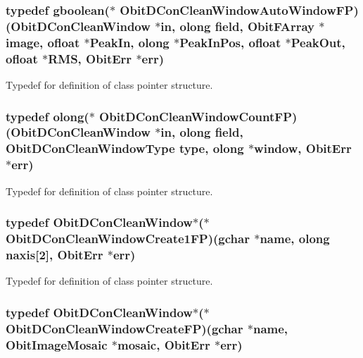 \subsubsection{\setlength{\rightskip}{0pt plus 5cm}typedef gboolean($\ast$ {\bf Obit\-DCon\-Clean\-Window\-Auto\-Window\-FP})({\bf Obit\-DCon\-Clean\-Window} $\ast$in, {\bf olong} field, {\bf Obit\-FArray} $\ast$image, {\bf ofloat} $\ast$Peak\-In, {\bf olong} $\ast$Peak\-In\-Pos, {\bf ofloat} $\ast$Peak\-Out, {\bf ofloat} $\ast$RMS, {\bf Obit\-Err} $\ast$err)}\label{ObitDConCleanWindow_8h_a18}


Typedef for definition of class pointer structure. 

\subsubsection{\setlength{\rightskip}{0pt plus 5cm}typedef {\bf olong}($\ast$ {\bf Obit\-DCon\-Clean\-Window\-Count\-FP})({\bf Obit\-DCon\-Clean\-Window} $\ast$in, {\bf olong} field, {\bf Obit\-DCon\-Clean\-Window\-Type} type, {\bf olong} $\ast$window, {\bf Obit\-Err} $\ast$err)}\label{ObitDConCleanWindow_8h_a17}


Typedef for definition of class pointer structure. 

\subsubsection{\setlength{\rightskip}{0pt plus 5cm}typedef {\bf Obit\-DCon\-Clean\-Window}$\ast$($\ast$ {\bf Obit\-DCon\-Clean\-Window\-Create1FP})(gchar $\ast$name, {\bf olong} naxis[2], {\bf Obit\-Err} $\ast$err)}\label{ObitDConCleanWindow_8h_a4}


Typedef for definition of class pointer structure. 

\subsubsection{\setlength{\rightskip}{0pt plus 5cm}typedef {\bf Obit\-DCon\-Clean\-Window}$\ast$($\ast$ {\bf Obit\-DCon\-Clean\-Window\-Create\-FP})(gchar $\ast$name, {\bf Obit\-Image\-Mosaic} $\ast$mosaic, {\bf Obit\-Err} $\ast$err)}\label{ObitDConCleanWindow_8h_a3}


